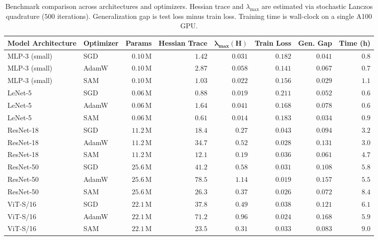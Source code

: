 \documentclass[twocolumn,10pt]{article}
\newcommand{\Hmat}{\mathbf{H}}
\begin{document}
\begin{table}[t]
\centering
\caption{Benchmark comparison across architectures and optimizers. Hessian trace and $\lambda_{\max}$ are estimated via stochastic Lanczos quadrature ($500$ iterations). Generalization gap is test loss minus train loss. Training time is wall-clock on a single A100 GPU.}
\label{tab:benchmark}
\small
\begin{tabular}{@{}llrrrrrr@{}}
\toprule
\textbf{Model Architecture} & \textbf{Optimizer} & \textbf{Params} & \textbf{Hessian Trace} & $\boldsymbol{\lambda_{\max}(\Hmat)}$ & \textbf{Train Loss} & \textbf{Gen. Gap} & \textbf{Time (h)} \\
\midrule
MLP-3 (small)      & SGD    & $0.10$\,M & $1.42$ & $0.031$ & $0.182$ & $0.041$ & $0.8$ \\
MLP-3 (small)      & AdamW  & $0.10$\,M & $2.87$ & $0.058$ & $0.141$ & $0.067$ & $0.7$ \\
MLP-3 (small)      & SAM    & $0.10$\,M & $1.03$ & $0.022$ & $0.156$ & $0.029$ & $1.1$ \\
\midrule
LeNet-5            & SGD    & $0.06$\,M & $0.88$ & $0.019$ & $0.211$ & $0.052$ & $0.6$ \\
LeNet-5            & AdamW  & $0.06$\,M & $1.64$ & $0.041$ & $0.168$ & $0.078$ & $0.6$ \\
LeNet-5            & SAM    & $0.06$\,M & $0.61$ & $0.014$ & $0.183$ & $0.034$ & $0.9$ \\
\midrule
ResNet-18          & SGD    & $11.2$\,M & $18.4$ & $0.27$ & $0.043$ & $0.094$ & $3.2$ \\
ResNet-18          & AdamW  & $11.2$\,M & $34.7$ & $0.52$ & $0.028$ & $0.131$ & $3.0$ \\
ResNet-18          & SAM    & $11.2$\,M & $12.1$ & $0.19$ & $0.036$ & $0.061$ & $4.7$ \\
\midrule
ResNet-50          & SGD    & $25.6$\,M & $41.2$ & $0.58$ & $0.031$ & $0.108$ & $5.8$ \\
ResNet-50          & AdamW  & $25.6$\,M & $78.5$ & $1.14$ & $0.019$ & $0.157$ & $5.5$ \\
ResNet-50          & SAM    & $25.6$\,M & $26.3$ & $0.37$ & $0.026$ & $0.072$ & $8.4$ \\
\midrule
ViT-S/16           & SGD    & $22.1$\,M & $37.8$ & $0.49$ & $0.038$ & $0.121$ & $6.1$ \\
ViT-S/16           & AdamW  & $22.1$\,M & $71.2$ & $0.96$ & $0.024$ & $0.168$ & $5.9$ \\
ViT-S/16           & SAM    & $22.1$\,M & $23.5$ & $0.31$ & $0.033$ & $0.083$ & $9.0$ \\

\end{tabular}
\end{table}
\end{document}
